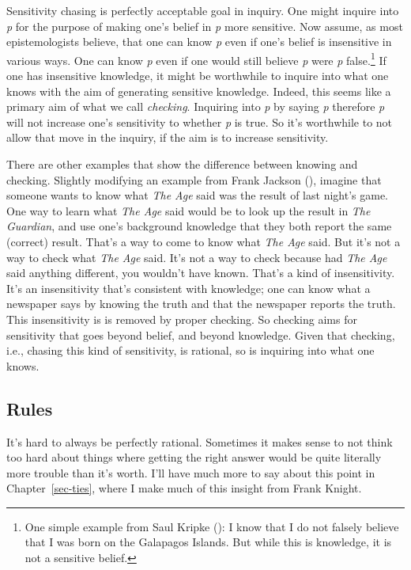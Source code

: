 \documentclass[
  10pt,
  letterpaper,
  twoside]{scrbook}
\begin{document}
Sensitivity chasing is perfectly acceptable goal in inquiry. One might
inquire into \emph{p} for the purpose of making one's belief in \emph{p}
more sensitive. Now assume, as most epistemologists believe, that one
can know \emph{p} even if one's belief is insensitive in various ways.
One can know \emph{p} even if one would still believe \emph{p} were
\emph{p} false.\footnote{One simple example from Saul Kripke
  (): I know that I do not falsely
  believe that I was born on the Galapagos Islands. But while this is
  knowledge, it is not a sensitive belief.} If one has insensitive
knowledge, it might be worthwhile to inquire into what one knows with
the aim of generating sensitive knowledge. Indeed, this seems like a
primary aim of what we call \emph{checking}. Inquiring into \emph{p} by
saying \emph{p} therefore \emph{p} will not increase one's sensitivity
to whether \emph{p} is true. So it's worthwhile to not allow that move
in the inquiry, if the aim is to increase sensitivity.

There are other examples that show the difference between knowing and
checking. Slightly modifying an example from Frank Jackson
(), imagine that someone wants to know
what \emph{The Age} said was the result of last night's game. One way to
learn what \emph{The Age} said would be to look up the result in
\emph{The Guardian}, and use one's background knowledge that they both
report the same (correct) result. That's a way to come to know what
\emph{The Age} said. But it's not a way to check what \emph{The Age}
said. It's not a way to check because had \emph{The Age} said anything
different, you wouldn't have known. That's a kind of insensitivity. It's
an insensitivity that's consistent with knowledge; one can know what a
newspaper says by knowing the truth and that the newspaper reports the
truth. This insensitivity is is removed by proper checking. So checking
aims for sensitivity that goes beyond belief, and beyond knowledge.
Given that checking, i.e., chasing this kind of sensitivity, is
rational, so is inquiring into what one knows.

\subsection{Rules}\label{sec-rulesinquiry}

It's hard to always be perfectly rational. Sometimes it makes sense to
not think too hard about things where getting the right answer would be
quite literally more trouble than it's worth. I'll have much more to say
about this point in Chapter~\ref{sec-ties}, where I make much of this
insight from Frank Knight.
\end{document}
